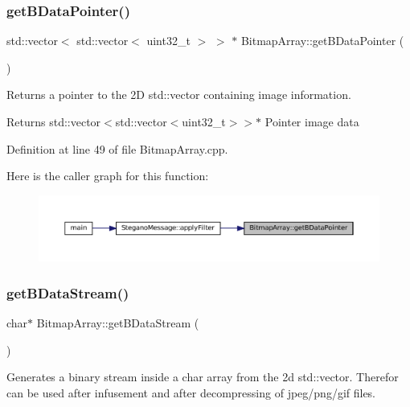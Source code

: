 \subsubsection{\texorpdfstring{getBDataPointer()}{getBDataPointer()}}
{\footnotesize\ttfamily std\+::vector$<$ std\+::vector$<$ uint32\+\_\+t $>$ $>$ $\ast$ Bitmap\+Array\+::get\+B\+Data\+Pointer (\begin{DoxyParamCaption}{ }\end{DoxyParamCaption})}



Returns a pointer to the 2D std\+::vector containing image information. 

\begin{DoxyReturn}{Returns}
std\+::vector$<$std\+::vector$<$uint32\+\_\+t$>$$>$$\ast$ Pointer image data 
\end{DoxyReturn}


Definition at line 49 of file Bitmap\+Array.\+cpp.

Here is the caller graph for this function\+:\nopagebreak
\begin{figure}[H]
\begin{center}
\leavevmode
\includegraphics[width=350pt]{classBitmapArray_ab914d6282460b386b2b5f936190487a2_icgraph}
\end{center}
\end{figure}
\mbox{\label{classBitmapArray_aebf9b67e7f535bb7e6be62470fe6316e}} 
\subsubsection{\texorpdfstring{getBDataStream()}{getBDataStream()}\hspace{0.1cm}{\footnotesize\ttfamily [1/2]}}
{\footnotesize\ttfamily char$\ast$ Bitmap\+Array\+::get\+B\+Data\+Stream (\begin{DoxyParamCaption}{ }\end{DoxyParamCaption})}



Generates a binary stream inside a char array from the 2d std\+::vector. Therefor can be used after infusement and after decompressing of jpeg/png/gif files. 

